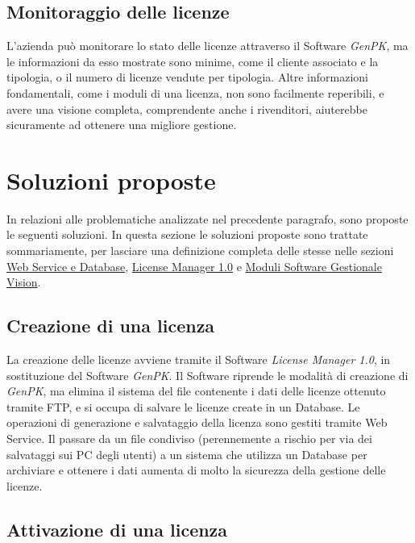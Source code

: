 \subsection{Monitoraggio delle licenze}
L'azienda può monitorare lo stato delle licenze attraverso il Software \textit{GenPK}, ma le informazioni da esso mostrate sono minime, come il cliente associato e la tipologia, o il numero di licenze vendute per tipologia. Altre informazioni fondamentali, come i moduli di una licenza, non sono facilmente reperibili, e avere una visione completa, comprendente anche i rivenditori, aiuterebbe sicuramente ad ottenere una migliore gestione.



\section{Soluzioni proposte}

In relazioni alle problematiche analizzate nel precedente paragrafo, sono proposte le seguenti soluzioni. In questa sezione le soluzioni proposte sono trattate sommariamente, per lasciare una definizione completa delle stesse nelle sezioni {\hyperref[cap:sviluppo-software]{Web Service e Database}}, {\hyperref[cap:license-manager]{License Manager 1.0}} e {\hyperref[cap:moduli-vision]{Moduli Software Gestionale Vision}}.

\subsection{Creazione di una licenza}

La creazione delle licenze avviene tramite il Software \textit{License Manager 1.0}, in sostituzione del Software \textit{GenPK}. Il Software riprende le modalità di creazione di \textit{GenPK}, ma elimina il sistema del file contenente i dati delle licenze ottenuto tramite FTP, e si occupa di salvare le licenze create in un Database. Le operazioni di generazione e salvataggio della  licenza sono gestiti tramite Web Service. 
Il passare da un file condiviso (perennemente a rischio per via dei salvataggi sui PC degli utenti) a un sistema che utilizza un Database per archiviare e ottenere i dati aumenta di molto la sicurezza della gestione delle licenze.

\subsection{Attivazione di una licenza}

